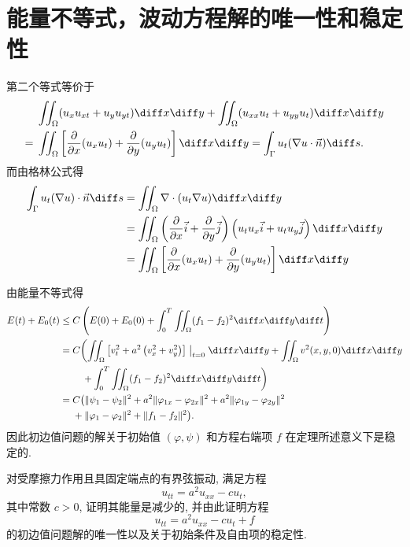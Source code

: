 \section{能量不等式，波动方程解的唯一性和稳定性}

\begin{note}[教材(6.15)式解释]
  第二个等式等价于
  \begin{align*}
        & \iint_{\Omega}(u_xu_{xt}+u_yu_{yt})\diff x\diff y
          +\iint_{\Omega}(u_{xx}u_t+u_{yy}u_t)\diff x\diff y \\
    ={} & \iint_{\Omega}\left[\frac{\partial}{\partial x}(u_xu_t)
          +\frac{\partial}{\partial y}(u_yu_t)\right]\diff x\diff y
          =\int_{\Gamma}u_t(\nabla u\cdot\vec{n})\diff s.
  \end{align*}
  而由格林公式得
  \[\begin{split}\int_{\Gamma}u_t(\nabla u)\cdot\vec{n}\diff s&=\iint_{\Omega}\nabla\cdot(u_t\nabla u)\diff x\diff y\\
  &=\iint_{\Omega}\left(\frac{\partial}{\partial x}\vec{i}+\frac{\partial}{\partial y}\vec{j}\right)\left(u_tu_x\vec{i}+u_tu_y\vec{j}\right)\diff x\diff y\\
  &=\iint_{\Omega}\left[\frac{\partial}{\partial x}(u_xu_t)+\frac{\partial}{\partial y}(u_yu_t)\right]\diff x\diff y\end{split}\]
\end{note}

\begin{note}[定理6.2]
  由能量不等式得
  \begin{align*}
    E(t)+E_0(t)
    \leq{} & C\left(E(0)+E_0(0)+\int_0^T
      \iint_{\Omega}(f_1-f_2)^2\diff x\diff y\diff t\right) \\
    ={} & C\biggl(\iint_{\Omega}\left[v_t^2+a^2\left(v_x^2+v_y^2\right)\right]\bigm|_{t=0}
          \diff x\diff y + \iint_{\Omega}v^2(x,y,0)\diff x\diff y \\
        & \quad + \int_0^T \iint_{\Omega}( f_1-f_2)^2\diff x\diff y\diff t\biggr) \\
    ={} & C\bigl(\|\psi_1-\psi_2\|^2+a^2\|\varphi_{1x}-\varphi_{2x}\|^2
          + a^2\|\varphi_{1y}-\varphi_{2y}\|^2 \\
        & + \|\varphi_1-\varphi_2\|^2+\|f_1-f_2\|^2\bigr).
  \end{align*}
  因此初边值问题的解关于初始值 $(\varphi,\psi)$ 和方程右端项 $f$ 在定理所述意义下是稳定的.
\end{note}


\begin{exercise}
  对受摩擦力作用且具固定端点的有界弦振动, 满足方程
  \[u_{tt} = a^2u_{xx} - cu_t,\]
  其中常数 $c>0$, 证明其能量是减少的, 并由此证明方程
  \[u_{tt} = a^2u_{xx} - cu_t + f\]
  的初边值问题解的唯一性以及关于初始条件及自由项的稳定性.
\end{exercise}

